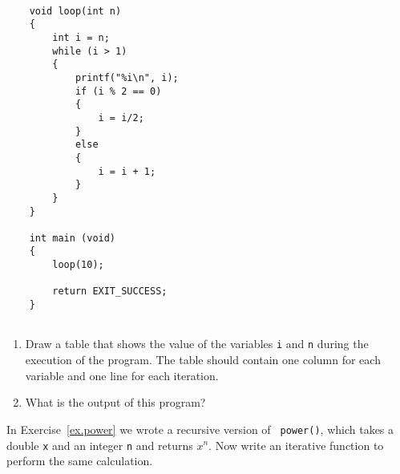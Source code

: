 

\begin{exercise}\label{infloop}
\begin{verbatim}

    void loop(int n) 
    {
        int i = n;
        while (i > 1) 
        {
            printf("%i\n", i);
            if (i % 2 == 0) 
            {
                i = i/2;
            } 
            else 
            {
                i = i + 1;
            }
        }
    }

    int main (void) 
    {
        loop(10);
        
        return EXIT_SUCCESS;
    }
    
\end{verbatim}
%
\begin{enumerate}

\item  Draw a table that shows the value of the variables {\tt i} and {\tt n} during the execution of the program. 
The table should contain one column for each variable and one line for each iteration.


\item What is the output of this program?

\end{enumerate}
\end{exercise}



\begin{exercise}
In Exercise~\ref{ex.power} we wrote a recursive version of {\tt
power()}, which takes a double {\tt x} and an integer {\tt n} and
returns $x^n$.  Now write an iterative function to perform the same
calculation.
\end{exercise}




